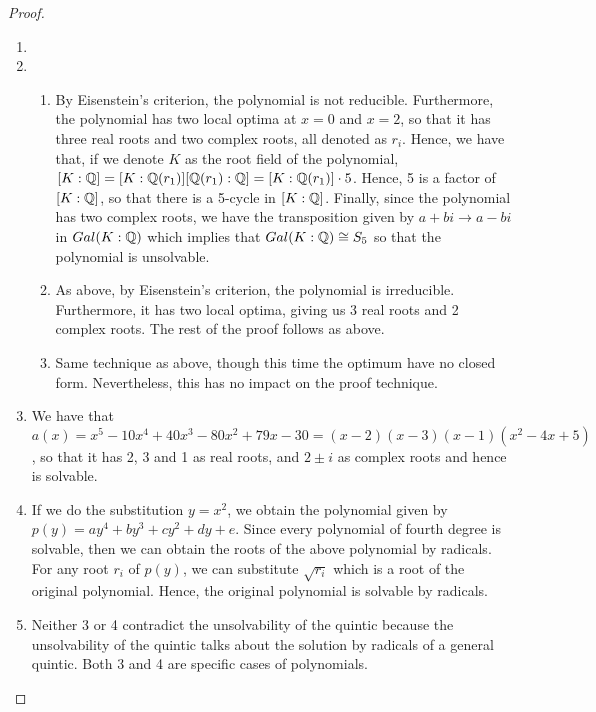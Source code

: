 \begin{proof}
 \begin{enumerate}
     \item 
     \item
     \begin{enumerate}
         \item By Eisenstein's criterion, the polynomial is not reducible. Furthermore, the polynomial has two local optima at $x=0$ and $x=2$, so that it has three real roots and two complex roots, all denoted as $r_i$. Hence, we have that, if we denote $K$ as the root field of the polynomial, $[K:\mathbb{Q}]=[K:\mathbb{Q}(r_1)][\mathbb{Q}(r_1):\mathbb{Q}]=[K:\mathbb{Q}(r_1)]\cdot 5$. Hence, 5 is a factor of $[K:\mathbb{Q}]$, so that there is a 5-cycle in $[K:\mathbb{Q}]$. Finally, since the polynomial has two complex roots, we have the transposition given by $a+bi\to a-bi$ in $Gal(K:\mathbb{Q})$ which implies that $Gal(K:\mathbb{Q})\cong S_5$ so that the polynomial is unsolvable.
         \item As above, by Eisenstein's criterion, the polynomial is irreducible. Furthermore, it has two local optima, giving us 3 real roots and 2 complex roots. The rest of the proof follows as above.
         \item Same technique as above, though this time the optimum have no closed form. Nevertheless, this has no impact on the proof technique. 
     \end{enumerate}
     \item We have that $a(x)=x^5-10x^4+40x^3-80x^2+79x-30= (x-2)(x-3)(x-1)(x^2-4x+5)$, so that it has 2, 3 and 1 as real roots, and $2\pm i$ as complex roots and hence is solvable.
     \item If we do the substitution $y=x^2$, we obtain the polynomial given by $p(y)=ay^4+by^3+cy^2+dy+e$. Since every polynomial of fourth degree is solvable, then we can obtain the roots of the above polynomial by radicals. For any root $r_i$ of $p(y)$, we can substitute $\sqrt{r_i}$ which is a root of the original polynomial. Hence, the original polynomial is solvable by radicals.
    \item Neither 3 or 4 contradict the unsolvability of the quintic because the unsolvability of the quintic talks about the solution by radicals of a general quintic. Both 3 and 4 are specific cases of polynomials.
 \end{enumerate}
\end{proof}

